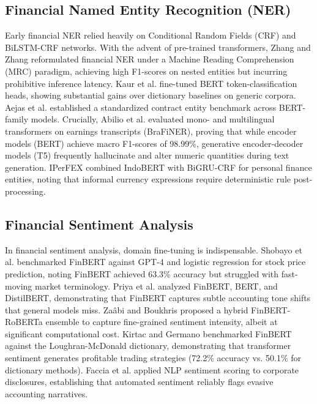 \documentclass[conference]{IEEEtran}
\begin{document}
\subsection{Financial Named Entity Recognition (NER)}
Early financial NER relied heavily on Conditional Random Fields (CRF) and BiLSTM-CRF networks. With the advent of pre-trained transformers, Zhang and Zhang \cite{b1} reformulated financial NER under a Machine Reading Comprehension (MRC) paradigm, achieving high F1-scores on nested entities but incurring prohibitive inference latency. Kaur et al. \cite{b2} fine-tuned BERT token-classification heads, showing substantial gains over dictionary baselines on generic corpora. Aejas et al. \cite{b3} established a standardized contract entity benchmark across BERT-family models. Crucially, Abilio et al. \cite{b4} evaluated mono- and multilingual transformers on earnings transcripts (BraFiNER), proving that while encoder models (BERT) achieve macro F1-scores of 98.99\%, generative encoder-decoder models (T5) frequently hallucinate and alter numeric quantities during text generation. IPerFEX \cite{b5} combined IndoBERT with BiGRU-CRF for personal finance entities, noting that informal currency expressions require deterministic rule post-processing.

\subsection{Financial Sentiment Analysis}
In financial sentiment analysis, domain fine-tuning is indispensable. Shobayo et al. \cite{b6} benchmarked FinBERT against GPT-4 and logistic regression for stock price prediction, noting FinBERT achieved 63.3\% accuracy but struggled with fast-moving market terminology. Priya et al. \cite{b7} analyzed FinBERT, BERT, and DistilBERT, demonstrating that FinBERT captures subtle accounting tone shifts that general models miss. Zaâbi and Boukhris \cite{b8} proposed a hybrid FinBERT-RoBERTa ensemble to capture fine-grained sentiment intensity, albeit at significant computational cost. Kirtac and Germano \cite{b9} benchmarked FinBERT against the Loughran-McDonald dictionary, demonstrating that transformer sentiment generates profitable trading strategies (72.2\% accuracy vs. 50.1\% for dictionary methods). Faccia et al. \cite{b10} applied NLP sentiment scoring to corporate disclosures, establishing that automated sentiment reliably flags evasive accounting narratives.
\end{document}
